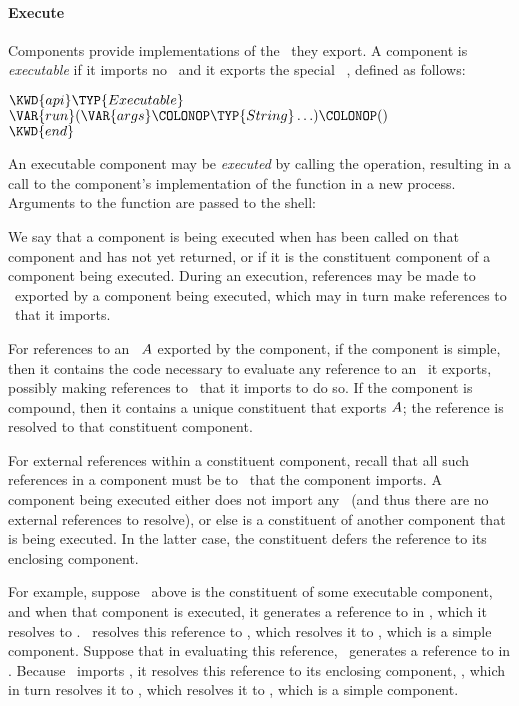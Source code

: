 \paragraph{Execute}

Components provide implementations of the \apisN\ they export.
A component is \emph{executable} if it imports no \apisN\
and it exports the special \apiN\ \execapi,
defined as follows:

\begin{Fortress}
\(\KWD{api} \TYP{Executable}\)\\
\(\VAR{run}(\VAR{args}\COLONOP\TYP{String}\ldots)\COLONOP()\)\\
\(\KWD{end}\)
\end{Fortress}

An executable component may be \emph{executed} by calling the
 operation,
resulting in a call to the component's implementation of the
 function in a new process.
Arguments to the \VAR{run} function are passed to the shell:


We say that a component is being executed when
 has been called on that component
and has not yet returned,
or if it is the constituent component of a component being executed.
During an execution,
references may be made to \apisN\ exported by a component being executed,
which may in turn make references to \apisN\ that it imports.

For references to an \apiN\ $A$ exported by the component,
if the component is simple,
then it contains the code necessary to evaluate
any reference to an \apiN\ it exports,
possibly making references to \apisN\ that it imports to do so.
If the component is compound,
then it contains a unique constituent
that exports $A$;
the reference is resolved to that constituent component.

For external references within a constituent component,
recall that all such references in a component
must be to \apisN\ that the component imports.
A component being executed either does not import any \apiN\
(and thus there are no external references to resolve),
or else is a constituent of another component
that is being executed.
In the latter case, the constituent defers the reference
to its enclosing component.

For example,
suppose \coolcrypto\ above is the constituent
of some executable component,
and when that component is executed,
it generates a reference to  in \fortcryp,
which it resolves to \coolcrypto.
\coolcrypto\ resolves this reference to \ironlink,
which resolves it to \ironcryp,
which is a simple component.
Suppose that in evaluating this reference,
\ironcryp\ generates
a reference to  in \fortsec.
Because \ironcryp\ imports \fortsec,
it resolves this reference to its enclosing component, \ironlink,
which in turn resolves it to \coolcrypto,
which resolves it to \ironsec,
which is a simple component.



